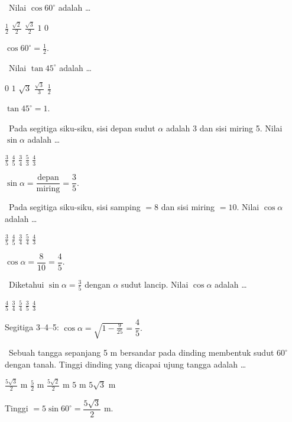 \documentclass[11pt,a4paper]{exam}
\newcommand{\Fund}{{\footnotesize\textsf{\textcolor{hijau}{[Fundamental]}}}\ }
\newcommand{\Inter}{{\footnotesize\textsf{\textcolor{biru}{[Intermediate]}}}\ }
\begin{document}
\begin{questions}
\question \Fund Nilai $\cos 60^\circ$ adalah \dots
\begin{choices}
\CorrectChoice $\tfrac{1}{2}$ \choice $\tfrac{\sqrt{2}}{2}$ \choice $\tfrac{\sqrt{3}}{2}$ \choice $1$ \choice $0$
\end{choices}
\begin{solution}$\cos 60^\circ = \tfrac{1}{2}.$\end{solution}

\question \Fund Nilai $\tan 45^\circ$ adalah \dots
\begin{choices}
\choice $0$ \CorrectChoice $1$ \choice $\sqrt{3}$ \choice $\tfrac{\sqrt{3}}{3}$ \choice $\tfrac{1}{2}$
\end{choices}
\begin{solution}$\tan 45^\circ = 1.$\end{solution}

\question \Fund Pada segitiga siku-siku, sisi depan sudut $\alpha$ adalah 3 dan sisi
miring 5. Nilai $\sin\alpha$ adalah \dots
\begin{choices}
\CorrectChoice $\tfrac{3}{5}$ \choice $\tfrac{4}{5}$ \choice $\tfrac{3}{4}$ \choice $\tfrac{5}{3}$ \choice $\tfrac{4}{3}$
\end{choices}
\begin{solution}$\sin\alpha = \dfrac{\text{depan}}{\text{miring}} = \dfrac{3}{5}.$\end{solution}

\question \Inter Pada segitiga siku-siku, sisi samping $= 8$ dan sisi miring $= 10$.
Nilai $\cos\alpha$ adalah \dots
\begin{choices}
\choice $\tfrac{3}{5}$ \CorrectChoice $\tfrac{4}{5}$ \choice $\tfrac{3}{4}$ \choice $\tfrac{5}{4}$ \choice $\tfrac{4}{3}$
\end{choices}
\begin{solution}$\cos\alpha = \dfrac{8}{10} = \dfrac{4}{5}.$\end{solution}

\question \Inter Diketahui $\sin\alpha = \tfrac{3}{5}$ dengan $\alpha$ sudut lancip.
Nilai $\cos\alpha$ adalah \dots
\begin{choices}
\CorrectChoice $\tfrac{4}{5}$ \choice $\tfrac{3}{4}$ \choice $\tfrac{5}{4}$ \choice $\tfrac{3}{5}$ \choice $\tfrac{4}{3}$
\end{choices}
\begin{solution}Segitiga 3–4–5: $\cos\alpha = \sqrt{1-\tfrac{9}{25}} = \dfrac{4}{5}.$\end{solution}

\question \Inter Sebuah tangga sepanjang 5 m bersandar pada dinding membentuk
sudut $60^\circ$ dengan tanah. Tinggi dinding yang dicapai ujung tangga adalah \dots
\begin{choices}
\CorrectChoice $\tfrac{5\sqrt{3}}{2}$ m \choice $\tfrac{5}{2}$ m
\choice $\tfrac{5\sqrt{2}}{2}$ m \choice $5$ m \choice $5\sqrt{3}$ m
\end{choices}
\begin{solution}Tinggi $= 5\sin 60^\circ = \dfrac{5\sqrt3}{2}$ m.\end{solution}


\end{questions}
\end{document}

